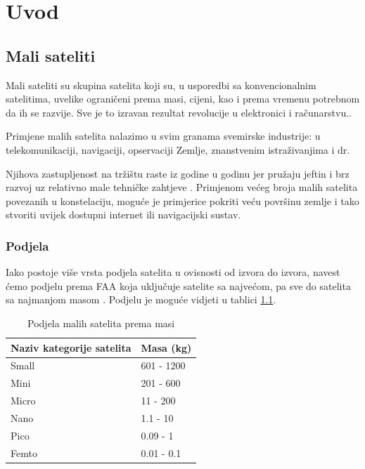 \documentclass[times, utf8, diplomski, numeric]{templates/template}
\begin{document}
\chapter{Uvod}{
    \section{Mali sateliti}{
        Mali sateliti su skupina satelita koji su, u usporedbi sa konvencionalnim satelitima, uvelike ograničeni prema masi, cijeni, kao i prema vremenu potrebnom da ih se razvije. Sve je to izravan rezultat revolucije u elektronici i računarstvu.\cite{hrvatskiVojnik}.

        Primjene malih satelita nalazimo u svim granama svemirske industrije: u telekomunikaciji, navigaciji, opservaciji Zemlje, znanstvenim istraživanjima i dr.
        
        Njihova zastupljenost na tržištu raste iz godine u godinu jer pružaju jeftin i brz razvoj uz relativno male tehničke zahtjeve \cite{rastMalihSatelita}. Primjenom većeg broja malih satelita povezanih u konstelaciju, moguće je primjerice pokriti veću površinu zemlje i tako stvoriti uvijek dostupni internet ili navigacijski sustav.
        
        \subsection{Podjela}{
            Iako postoje više vrsta podjela satelita u ovisnosti od izvora do izvora, navest ćemo podjelu prema FAA  koja uključuje satelite sa najvećom, pa sve do satelita sa najmanjom masom \cite{podjelaPremaMasi}. Podjelu je moguće vidjeti u tablici \ref{tbl:podjelaSatelita}.

            \begin{table}[htb]
            \caption{Podjela malih satelita prema masi}
            \label{tbl:podjelaSatelita}
            \centering
            \begin{tabular}{ll} \toprule
            Naziv kategorije satelita & Masa (kg) \\ \midrule
            Small & 601 - 1200 \\
            Mini & 201 - 600 \\
            Micro & 11 - 200 \\
            Nano & 1.1 - 10 \\
            Pico & 0.09 - 1 \\
            Femto & 0.01 - 0.1 \\ \bottomrule
            \end{tabular}
            \end{table}

}}}
\end{document}
